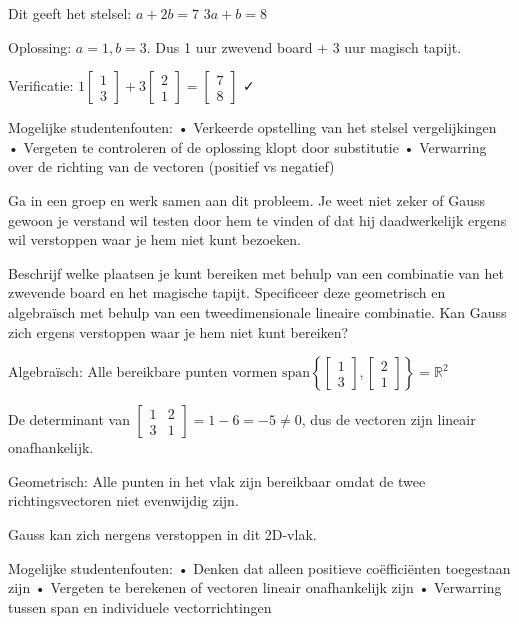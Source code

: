 \documentclass{ximera}
\begin{document}
\begin{problem}
\begin{freeResponse}
Dit geeft het stelsel:
$a + 2b = 7$
$3a + b = 8$

Oplossing: $a = 1, b = 3$. Dus 1 uur zwevend board + 3 uur magisch tapijt.

Verificatie: $1\begin{bmatrix} 1 \\ 3 \end{bmatrix} + 3\begin{bmatrix} 2 \\ 1 \end{bmatrix} = \begin{bmatrix} 7 \\ 8 \end{bmatrix}$ ✓

Mogelijke studentenfouten:
• Verkeerde opstelling van het stelsel vergelijkingen
• Vergeten te controleren of de oplossing klopt door substitutie
• Verwarring over de richting van de vectoren (positief vs negatief)
\end{freeResponse}
\end{problem}

\begin{problem}
Ga in een groep en werk samen aan dit probleem. Je weet niet zeker of Gauss gewoon je verstand wil testen door hem te vinden of dat hij daadwerkelijk ergens wil verstoppen waar je hem niet kunt bezoeken.

Beschrijf welke plaatsen je kunt bereiken met behulp van een combinatie van het zwevende board en het magische tapijt. Specificeer deze geometrisch en algebraïsch met behulp van een tweedimensionale lineaire combinatie. Kan Gauss zich ergens verstoppen waar je hem niet kunt bereiken?

\begin{freeResponse}
Algebraïsch: Alle bereikbare punten vormen $\text{span}\left\{\begin{bmatrix} 1 \\ 3 \end{bmatrix}, \begin{bmatrix} 2 \\ 1 \end{bmatrix}\right\} = \mathbb{R}^2$

De determinant van $\begin{bmatrix} 1 & 2 \\ 3 & 1 \end{bmatrix} = 1-6 = -5 \neq 0$, dus de vectoren zijn lineair onafhankelijk.

Geometrisch: Alle punten in het vlak zijn bereikbaar omdat de twee richtingsvectoren niet evenwijdig zijn.

Gauss kan zich nergens verstoppen in dit 2D-vlak.

Mogelijke studentenfouten:
• Denken dat alleen positieve coëfficiënten toegestaan zijn
• Vergeten te berekenen of vectoren lineair onafhankelijk zijn
• Verwarring tussen span en individuele vectorrichtingen
\end{freeResponse}
\end{problem}
\end{document}
